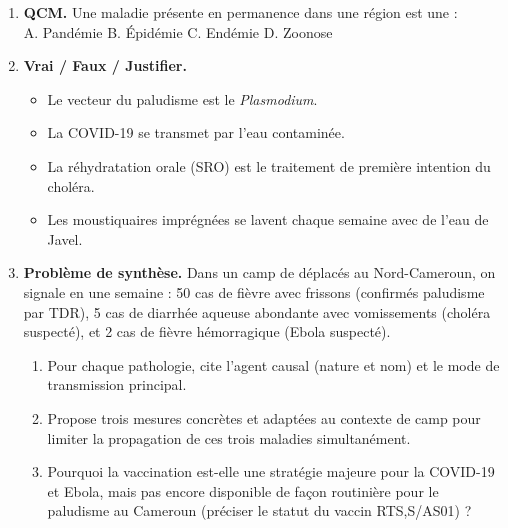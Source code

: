 \documentclass[11pt]{article}
\begin{document}
\begin{exercice}
\begin{enumerate}
\item \textbf{QCM.} Une maladie présente en permanence dans une région est une : \\
A. Pandémie \quad B. Épidémie \quad C. Endémie \quad D. Zoonose
\item \textbf{Vrai / Faux / Justifier.}
\begin{itemize}
\item[a)] Le vecteur du paludisme est le \emph{Plasmodium}.
\item[b)] La COVID-19 se transmet par l'eau contaminée.
\item[c)] La réhydratation orale (SRO) est le traitement de première intention du choléra.
\item[d)] Les moustiquaires imprégnées se lavent chaque semaine avec de l'eau de Javel.
\end{itemize}
\item \textbf{Problème de synthèse.} Dans un camp de déplacés au Nord-Cameroun, on signale en une semaine : 50 cas de fièvre avec frissons (confirmés paludisme par TDR), 5 cas de diarrhée aqueuse abondante avec vomissements (choléra suspecté), et 2 cas de fièvre hémorragique (Ebola suspecté).
\begin{enumerate}
\item Pour chaque pathologie, cite l'agent causal (nature et nom) et le mode de transmission principal.
\item Propose trois mesures concrètes et adaptées au contexte de camp pour limiter la propagation de ces trois maladies simultanément.
\item Pourquoi la vaccination est-elle une stratégie majeure pour la COVID-19 et Ebola, mais pas encore disponible de façon routinière pour le paludisme au Cameroun (préciser le statut du vaccin RTS,S/AS01) ?
\end{enumerate}
\end{enumerate}
\end{exercice}
\end{document}
